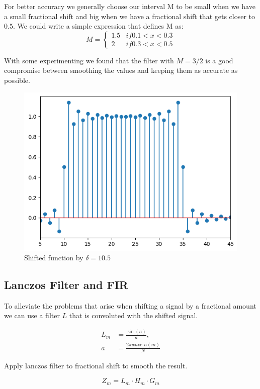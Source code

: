 \documentclass[]{usiinfbachelorproject}
\begin{document}
	For better accuracy we generally choose our interval M to be small when we have a small fractional shift and big when we have a fractional shift that gets closer to $0.5$. We could write a simple expression that defines M as:
	\begin{equation*}
		M = 
		\begin{cases}
			1.5 & if 0.1 < x < 0.3\\
			2 & if 0.3 < x < 0.5
		\end{cases}
	\end{equation*}
	
	With some experimenting we found that the filter with $M=3/2$ is a good compromise between smoothing the values and keeping them as accurate as possible.
	
	
	\iffalse

	
	\begin{figure}[h]
		\centering
		\includegraphics[width=0.5\columnwidth]{images/box_shifted_delta10_1_n50.png}
		\caption{Shifted function by $\delta=10.5$}
	\end{figure}
	
	\subsection{Lanczos Filter and FIR}
	To alleviate the problems that arise when shifting a signal by a fractional amount we can use a filter $L$ that is convoluted with the shifted signal.
	
	\begin{align*}
		L_m &= \frac{\sin(a)}{a},\\
		a &= \frac{2\pi wave\_n(m)}{N}
	\end{align*}
	
	Apply lanczos filter to fractional shift to smooth the result.
	
	\begin{equation*}
		Z_m = L_m \cdot H_m \cdot G_m
	\end{equation*}
	
\end{document}
